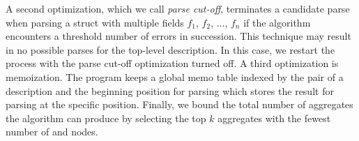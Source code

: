A second optimization, which we call {\em parse cut-off}, terminates a
candidate parse when parsing a struct with multiple
fields $f_1$, $f_2$, ..., $f_n$ if the algorithm encounters 
a threshold number of errors in succession. 
This technique may result in no possible parses for the
top-level description.  In this case, we restart the process
with the parse cut-off optimization turned off. 
A third optimization is memoization.
The program keeps a global memo table indexed by the pair of a
description  and the beginning position for parsing  which
stores the result for parsing  at the specific position.
Finally, we bound the total number of aggregates the
algorithm can produce by selecting the top
$k$ aggregates with the fewest number of  and 
nodes. 



